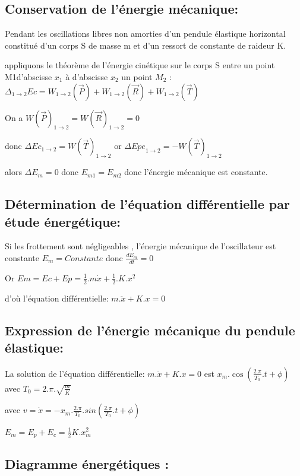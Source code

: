\documentclass[12pt]{article}
\begin{document}
\subsection{Conservation de l'énergie mécanique:}
Pendant les oscillations libres non amorties d'un pendule élastique horizontal constitué d'un corps S de masse m et d'un
ressort de constante de raideur K. 





appliquons le théorème de l'énergie cinétique sur le corps S entre un point M1d'abscisse $x_1$ à
d'abscisse $x_2$ un point $M_2$ : $\Delta_{1 \rightarrow 2}{Ec} = W_{1 \rightarrow 2}(\vec{P}) +  W_{1 \rightarrow 2}(\vec{R}) + W_{1 \rightarrow 2}(\vec{T})$

On a $W(\vec{P})_{1 \rightarrow 2} =W(\vec{R})_{1 \rightarrow 2}= 0$

donc $\Delta{Ec}_{1 \rightarrow 2} = W(\vec{T})_{1 \rightarrow 2}$ or $\Delta{Epe}_{1 \rightarrow 2} =- W(\vec{T})_{1 \rightarrow 2}$

alors $\Delta{E_m} = 0$  donc $E_{m1} = E_{m2}$ donc l'énergie mécanique est constante.

\subsection{Détermination de l'équation différentielle par étude énergétique: }

Si les frottement sont négligeables , l'énergie mécanique de l'oscillateur est constante $E_m = Constante$ donc $\frac{dE_m}{dt} = 0$

Or $Em = Ec + Ep = \frac{1}{2}.m\dot{x} + \frac{1}{2}.K.x^2$

d’où l'équation différentielle: $m.\ddot{x} + K.x = 0$

\subsection{Expression de l'énergie mécanique du pendule élastique:}

La solution de l'équation différentielle: $m.\ddot{x}+K.x=0$ est $x_m.\cos(\frac{2.\pi}{T_0}.t + \phi)$ avec $T_0 = 2.\pi.\sqrt{\frac{m}{K}}$

avec $v = \dot{x} = -x_m.\frac{2.\pi}{T_0}.sin(\frac{2.\pi}{T_0}.t+\phi)$

$E_m = E_p + E_c = \frac{1}{2}K.x_m^2$

\subsection{Diagramme énergétiques : }
\end{document}
